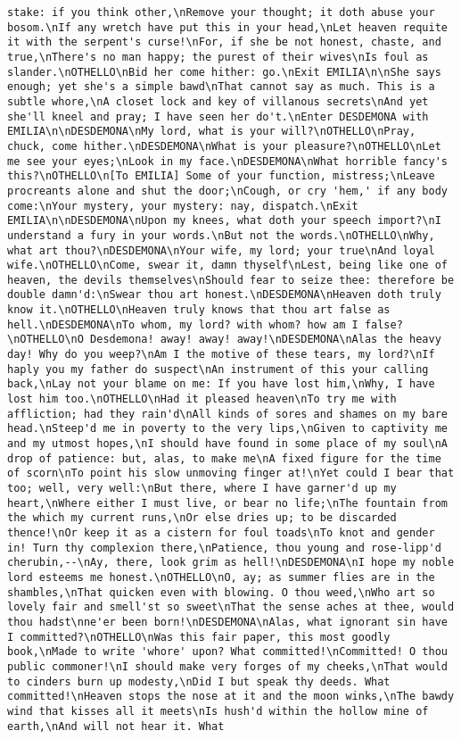 \begin{verbatim}
stake: if you think other,\nRemove your thought; it doth abuse your bosom.\nIf any wretch have put this in your head,\nLet heaven requite it with the serpent's curse!\nFor, if she be not honest, chaste, and true,\nThere's no man happy; the purest of their wives\nIs foul as slander.\nOTHELLO\nBid her come hither: go.\nExit EMILIA\n\nShe says enough; yet she's a simple bawd\nThat cannot say as much. This is a subtle whore,\nA closet lock and key of villanous secrets\nAnd yet she'll kneel and pray; I have seen her do't.\nEnter DESDEMONA with EMILIA\n\nDESDEMONA\nMy lord, what is your will?\nOTHELLO\nPray, chuck, come hither.\nDESDEMONA\nWhat is your pleasure?\nOTHELLO\nLet me see your eyes;\nLook in my face.\nDESDEMONA\nWhat horrible fancy's this?\nOTHELLO\n[To EMILIA] Some of your function, mistress;\nLeave procreants alone and shut the door;\nCough, or cry 'hem,' if any body come:\nYour mystery, your mystery: nay, dispatch.\nExit EMILIA\n\nDESDEMONA\nUpon my knees, what doth your speech import?\nI understand a fury in your words.\nBut not the words.\nOTHELLO\nWhy, what art thou?\nDESDEMONA\nYour wife, my lord; your true\nAnd loyal wife.\nOTHELLO\nCome, swear it, damn thyself\nLest, being like one of heaven, the devils themselves\nShould fear to seize thee: therefore be double damn'd:\nSwear thou art honest.\nDESDEMONA\nHeaven doth truly know it.\nOTHELLO\nHeaven truly knows that thou art false as hell.\nDESDEMONA\nTo whom, my lord? with whom? how am I false?\nOTHELLO\nO Desdemona! away! away! away!\nDESDEMONA\nAlas the heavy day! Why do you weep?\nAm I the motive of these tears, my lord?\nIf haply you my father do suspect\nAn instrument of this your calling back,\nLay not your blame on me: If you have lost him,\nWhy, I have lost him too.\nOTHELLO\nHad it pleased heaven\nTo try me with affliction; had they rain'd\nAll kinds of sores and shames on my bare head.\nSteep'd me in poverty to the very lips,\nGiven to captivity me and my utmost hopes,\nI should have found in some place of my soul\nA drop of patience: but, alas, to make me\nA fixed figure for the time of scorn\nTo point his slow unmoving finger at!\nYet could I bear that too; well, very well:\nBut there, where I have garner'd up my heart,\nWhere either I must live, or bear no life;\nThe fountain from the which my current runs,\nOr else dries up; to be discarded thence!\nOr keep it as a cistern for foul toads\nTo knot and gender in! Turn thy complexion there,\nPatience, thou young and rose-lipp'd cherubin,--\nAy, there, look grim as hell!\nDESDEMONA\nI hope my noble lord esteems me honest.\nOTHELLO\nO, ay; as summer flies are in the shambles,\nThat quicken even with blowing. O thou weed,\nWho art so lovely fair and smell'st so sweet\nThat the sense aches at thee, would thou hadst\nne'er been born!\nDESDEMONA\nAlas, what ignorant sin have I committed?\nOTHELLO\nWas this fair paper, this most goodly book,\nMade to write 'whore' upon? What committed!\nCommitted! O thou public commoner!\nI should make very forges of my cheeks,\nThat would to cinders burn up modesty,\nDid I but speak thy deeds. What committed!\nHeaven stops the nose at it and the moon winks,\nThe bawdy wind that kisses all it meets\nIs hush'd within the hollow mine of earth,\nAnd will not hear it. What 
\end{verbatim}
